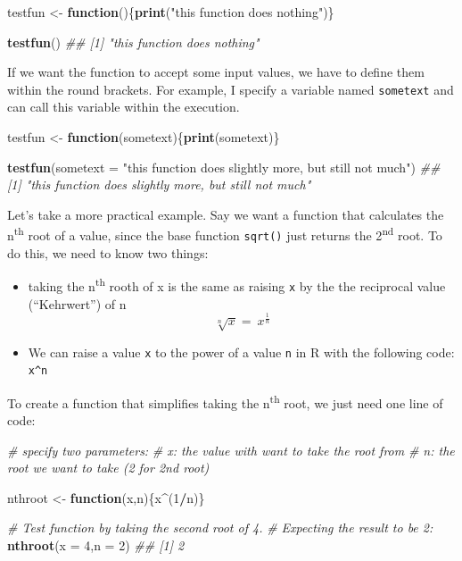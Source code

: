 \documentclass[]{book}
\newenvironment{Shaded}{\begin{snugshade}}{\end{snugshade}}
\newcommand{\CommentTok}[1]{\textcolor[rgb]{0.56,0.35,0.01}{\textit{#1}}}
\newcommand{\ControlFlowTok}[1]{\textcolor[rgb]{0.13,0.29,0.53}{\textbf{#1}}}
\newcommand{\DataTypeTok}[1]{\textcolor[rgb]{0.13,0.29,0.53}{#1}}
\newcommand{\DecValTok}[1]{\textcolor[rgb]{0.00,0.00,0.81}{#1}}
\newcommand{\KeywordTok}[1]{\textcolor[rgb]{0.13,0.29,0.53}{\textbf{#1}}}
\newcommand{\NormalTok}[1]{#1}
\newcommand{\OperatorTok}[1]{\textcolor[rgb]{0.81,0.36,0.00}{\textbf{#1}}}
\newcommand{\StringTok}[1]{\textcolor[rgb]{0.31,0.60,0.02}{#1}}
\providecommand{\tightlist}{%
  \setlength{\itemsep}{0pt}\setlength{\parskip}{0pt}}
\begin{document}
\begin{Shaded}
\begin{Highlighting}[]
\NormalTok{testfun <-}\StringTok{ }\ControlFlowTok{function}\NormalTok{()\{}\KeywordTok{print}\NormalTok{(}\StringTok{"this function does nothing"}\NormalTok{)\}}

\KeywordTok{testfun}\NormalTok{()}
\CommentTok{## [1] "this function does nothing"}
\end{Highlighting}
\end{Shaded}

If we want the function to accept some input values, we have to define them within the round brackets. For example, I specify a variable named \texttt{sometext} and can call this variable within the execution.

\begin{Shaded}
\begin{Highlighting}[]
\NormalTok{testfun <-}\StringTok{ }\ControlFlowTok{function}\NormalTok{(sometext)\{}\KeywordTok{print}\NormalTok{(sometext)\}}

\KeywordTok{testfun}\NormalTok{(}\DataTypeTok{sometext =} \StringTok{"this function does slightly more, but still not much"}\NormalTok{)}
\CommentTok{## [1] "this function does slightly more, but still not much"}
\end{Highlighting}
\end{Shaded}

Let's take a more practical example. Say we want a function that calculates the n\textsuperscript{th} root of a value, since the base function \texttt{sqrt()} just returns the 2\textsuperscript{nd} root. To do this, we need to know two things:

\begin{itemize}
\tightlist
\item
  taking the n\textsuperscript{th} rooth of x is the same as raising \texttt{x} by the the reciprocal value (``Kehrwert'') of n \[\sqrt[n]{x}=\ x^{\frac{1}{n}}\]
\item
  We can raise a value \texttt{x} to the power of a value \texttt{n} in R with the following code: \texttt{x\^{}n}
\end{itemize}

To create a function that simplifies taking the n\textsuperscript{th} root, we just need one line of code:

\begin{Shaded}
\begin{Highlighting}[]
\CommentTok{# specify two parameters:}
\CommentTok{# x: the value  with want to take the root from}
\CommentTok{# n: the root we want to take (2 for 2nd root)}

\NormalTok{nthroot <-}\StringTok{ }\ControlFlowTok{function}\NormalTok{(x,n)\{x}\OperatorTok{^}\NormalTok{(}\DecValTok{1}\OperatorTok{/}\NormalTok{n)\}}

\CommentTok{# Test function by taking the second root of 4. }
\CommentTok{# Expecting the result to be 2:}
\KeywordTok{nthroot}\NormalTok{(}\DataTypeTok{x =} \DecValTok{4}\NormalTok{,}\DataTypeTok{n =} \DecValTok{2}\NormalTok{)}
\CommentTok{## [1] 2}
\end{Highlighting}
\end{Shaded}
\end{document}
